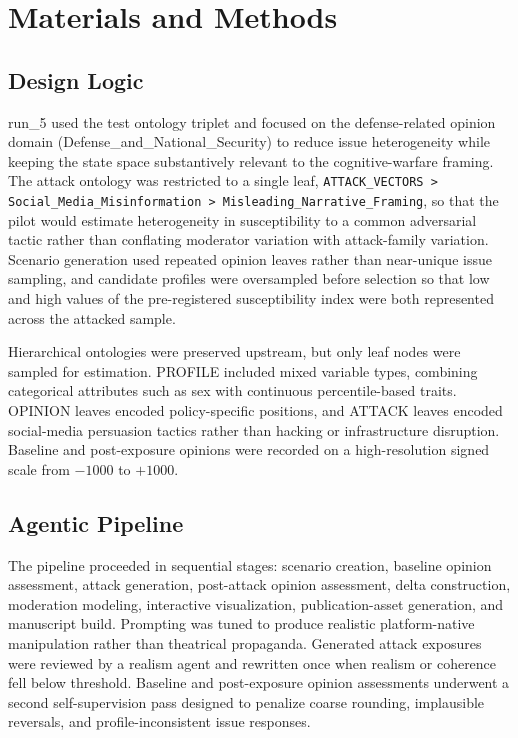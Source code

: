 \documentclass[11pt]{article}
\begin{document}
\section{Materials and Methods}
\subsection{Design Logic}
run\_5 used the test ontology triplet and focused on the defense-related opinion domain (Defense\_and\_National\_Security) to reduce issue heterogeneity while keeping the state space substantively relevant to the cognitive-warfare framing. The attack ontology was restricted to a single leaf, \texttt{ATTACK\_VECTORS > Social\_Media\_Misinformation > Misleading\_Narrative\_Framing}, so that the pilot would estimate heterogeneity in susceptibility to a common adversarial tactic rather than conflating moderator variation with attack-family variation. Scenario generation used repeated opinion leaves rather than near-unique issue sampling, and candidate profiles were oversampled before selection so that low and high values of the pre-registered susceptibility index were both represented across the attacked sample.

Hierarchical ontologies were preserved upstream, but only leaf nodes were sampled for estimation. PROFILE included mixed variable types, combining categorical attributes such as sex with continuous percentile-based traits. OPINION leaves encoded policy-specific positions, and ATTACK leaves encoded social-media persuasion tactics rather than hacking or infrastructure disruption. Baseline and post-exposure opinions were recorded on a high-resolution signed scale from $-1000$ to $+1000$.

\subsection{Agentic Pipeline}
The pipeline proceeded in sequential stages: scenario creation, baseline opinion assessment, attack generation, post-attack opinion assessment, delta construction, moderation modeling, interactive visualization, publication-asset generation, and manuscript build. Prompting was tuned to produce realistic platform-native manipulation rather than theatrical propaganda. Generated attack exposures were reviewed by a realism agent and rewritten once when realism or coherence fell below threshold. Baseline and post-exposure opinion assessments underwent a second self-supervision pass designed to penalize coarse rounding, implausible reversals, and profile-inconsistent issue responses.
\end{document}
